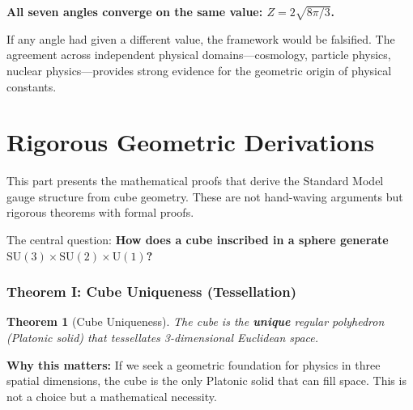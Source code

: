 \documentclass[11pt,a4paper]{article}
\theoremstyle{plain}
\newtheorem{theorem}{Theorem}[section]
\theoremstyle{definition}
\theoremstyle{remark}
\newcommand{\SUthree}{\text{SU}(3)}
\newcommand{\SUtwo}{\text{SU}(2)}
\newcommand{\Uone}{\text{U}(1)}
\begin{document}
\textbf{All seven angles converge on the same value: $Z = 2\sqrt{8\pi/3}$.}

If any angle had given a different value, the framework would be falsified. The agreement across independent physical domains---cosmology, particle physics, nuclear physics---provides strong evidence for the geometric origin of physical constants.

\part{Rigorous Geometric Derivations}

This part presents the mathematical proofs that derive the Standard Model gauge structure from cube geometry. These are not hand-waving arguments but rigorous theorems with formal proofs.

The central question: \textbf{How does a cube inscribed in a sphere generate $\SUthree \times \SUtwo \times \Uone$?}

\section{Theorem I: Cube Uniqueness (Tessellation)}

\begin{theorem}[Cube Uniqueness]
The cube is the \textbf{unique} regular polyhedron (Platonic solid) that tessellates 3-dimensional Euclidean space.
\end{theorem}

\textbf{Why this matters:} If we seek a geometric foundation for physics in three spatial dimensions, the cube is the only Platonic solid that can fill space. This is not a choice but a mathematical necessity.
\end{document}
